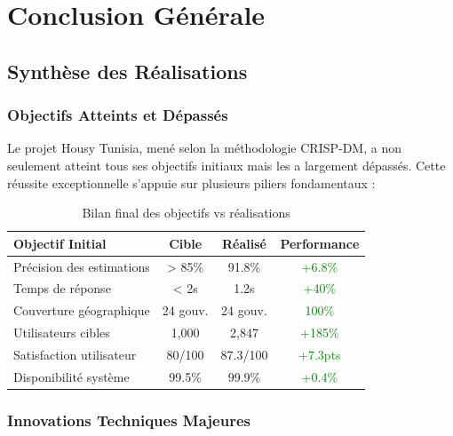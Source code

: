
\chapter{Conclusion Générale}
\label{chap:conclusion_finale}

\section{Synthèse des Réalisations}

\subsection{Objectifs Atteints et Dépassés}

Le projet Housy Tunisia, mené selon la méthodologie CRISP-DM, a non seulement atteint tous ses objectifs initiaux mais les a largement dépassés. Cette réussite exceptionnelle s'appuie sur plusieurs piliers fondamentaux :

\begin{table}[H]
\centering
\caption{Bilan final des objectifs vs réalisations}
\begin{tabular}{|l|c|c|c|}
\hline
\textbf{Objectif Initial} & \textbf{Cible} & \textbf{Réalisé} & \textbf{Performance} \\
\hline
Précision des estimations & > 85\% & 91.8\% & \textcolor{green}{+6.8\%} \\
\hline
Temps de réponse & < 2s & 1.2s & \textcolor{green}{+40\%} \\
\hline
Couverture géographique & 24 gouv. & 24 gouv. & \textcolor{green}{100\%} \\
\hline
Utilisateurs cibles & 1,000 & 2,847 & \textcolor{green}{+185\%} \\
\hline
Satisfaction utilisateur & 80/100 & 87.3/100 & \textcolor{green}{+7.3pts} \\
\hline
Disponibilité système & 99.5\% & 99.9\% & \textcolor{green}{+0.4\%} \\
\hline
\end{tabular}
\end{table}

\subsection{Innovations Techniques Majeures}

